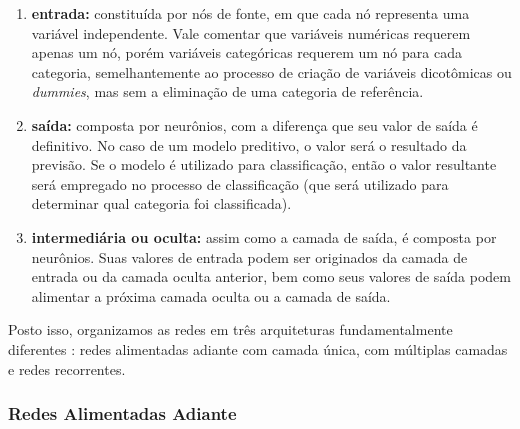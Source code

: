 \documentclass{automatextcc}
\newcommand{\bs}[1]{\boldsymbol{#1}}
\begin{document}
\begin{enumerate}
    \item \textbf{entrada:} constituída por nós de fonte, em que cada nó representa uma variável independente. Vale comentar que variáveis numéricas requerem apenas um nó, porém variáveis categóricas requerem um nó para cada categoria, semelhantemente ao processo de criação de variáveis dicotômicas ou \textit{dummies}, mas sem a eliminação de uma categoria de referência.
    \item \textbf{saída:} composta por neurônios, com a diferença que seu valor de saída é definitivo. No caso de um modelo preditivo, o valor será o resultado da previsão. Se o modelo é utilizado para classificação, então o valor resultante será empregado no processo de classificação (que será utilizado para determinar qual categoria foi classificada).
    \item \textbf{intermediária ou oculta:} assim como a camada de saída, é composta por neurônios. Suas valores de entrada podem ser originados da camada de entrada ou da camada oculta anterior, bem como seus valores de saída podem alimentar a próxima camada oculta ou a camada de saída.
\end{enumerate}
Posto isso, organizamos as redes em três arquiteturas fundamentalmente diferentes \citep{hair2005,haykin2008,hagan2014}: redes alimentadas adiante com camada única, com múltiplas camadas e redes recorrentes.


\subsubsection{Redes Alimentadas Adiante}


\end{document}
